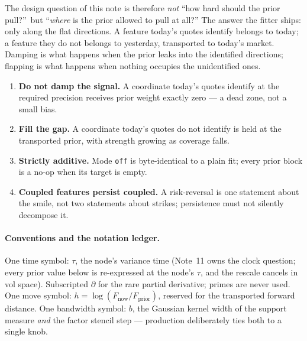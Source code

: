 \documentclass[11pt]{article}
\begin{document}
The design question of this note is therefore \emph{not} ``how hard
should the prior pull?''\ but ``\emph{where} is the prior allowed to
pull at all?''  The answer the fitter ships: only along the flat
directions.  A feature today's quotes identify belongs to today; a
feature they do not belongs to yesterday, transported to today's
market.  Damping is what happens when the prior leaks into the
identified directions; flapping is what happens when nothing occupies
the unidentified ones.

\begin{invariant}
\begin{enumerate}[leftmargin=1.6em]
\item \textbf{Do not damp the signal.}  A coordinate today's quotes
identify at the required precision receives prior weight exactly zero
--- a dead zone, not a small bias.
\item \textbf{Fill the gap.}  A coordinate today's quotes do not
identify is held at the transported prior, with strength growing as
coverage falls.
\item \textbf{Strictly additive.}  Mode \texttt{off} is byte-identical
to a plain fit; every prior block is a no-op when its target is empty.
\item \textbf{Coupled features persist coupled.}  A risk-reversal is
one statement about the smile, not two statements about strikes;
persistence must not silently decompose it.
\end{enumerate}
\end{invariant}

\paragraph{Conventions and the notation ledger.}
One time symbol: $\tau$, the node's variance time (Note~11 owns the
clock question; every prior value below is re-expressed at the node's
$\tau$, and the rescale cancels in vol space).  Subscripted $\partial$
for the rare partial derivative; primes are never used.  One move
symbol: $h=\log(F_{\text{now}}/F_{\text{prior}})$, reserved for the
transported forward distance.  One bandwidth symbol: $b$, the Gaussian
kernel width of the support measure \emph{and} the factor stencil step
--- production deliberately ties both to a single knob.
\end{document}
